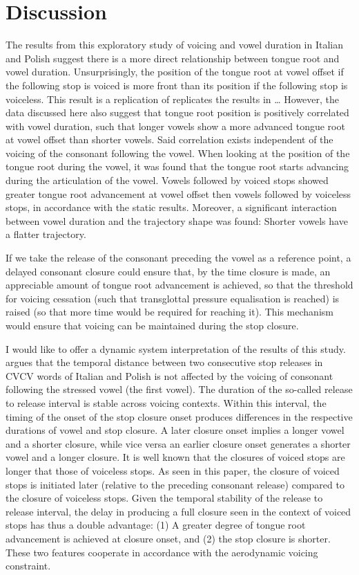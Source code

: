 \documentclass[12pt,]{article}
\begin{document}
\hypertarget{discussion}{%
\section{Discussion}\label{discussion}}

The results from this exploratory study of voicing and vowel duration in
Italian and Polish suggest there is a more direct relationship between
tongue root and vowel duration. Unsurprisingly, the position of the
tongue root at vowel offset if the following stop is voiced is more
front than its position if the following stop is voiceless. This result
is a replication of replicates the results in \ldots{} However, the data
discussed here also suggest that tongue root position is positively
correlated with vowel duration, such that longer vowels show a more
advanced tongue root at vowel offset than shorter vowels. Said
correlation exists independent of the voicing of the consonant following
the vowel. When looking at the position of the tongue root during the
vowel, it was found that the tongue root starts advancing during the
articulation of the vowel. Vowels followed by voiced stops showed
greater tongue root advancement at vowel offset then vowels followed by
voiceless stops, in accordance with the static results. Moreover, a
significant interaction between vowel duration and the trajectory shape
was found: Shorter vowels have a flatter trajectory.

If we take the release of the consonant preceding the vowel as a
reference point, a delayed consonant closure could ensure that, by the
time closure is made, an appreciable amount of tongue root advancement
is achieved, so that the threshold for voicing cessation (such that
transglottal pressure equalisation is reached) is raised (so that more
time would be required for reaching it). This mechanism would ensure
that voicing can be maintained during the stop closure.

I would like to offer a dynamic system interpretation of the results of
this study. \citet{coretta2018j} argues that the temporal distance
between two consecutive stop releases in CVCV words of Italian and
Polish is not affected by the voicing of consonant following the
stressed vowel (the first vowel). The duration of the so-called release
to release interval is stable across voicing contexts. Within this
interval, the timing of the onset of the stop closure onset produces
differences in the respective durations of vowel and stop closure. A
later closure onset implies a longer vowel and a shorter closure, while
vice versa an earlier closure onset generates a shorter vowel and a
longer closure. It is well known that the closures of voiced stops are
longer that those of voiceless stops. As seen in this paper, the closure
of voiced stops is initiated later (relative to the preceding consonant
release) compared to the closure of voiceless stops. Given the temporal
stability of the release to release interval, the delay in producing a
full closure seen in the context of voiced stops has thus a double
advantage: (1) A greater degree of tongue root advancement is achieved
at closure onset, and (2) the stop closure is shorter. These two
features cooperate in accordance with the aerodynamic voicing
constraint.
\end{document}
